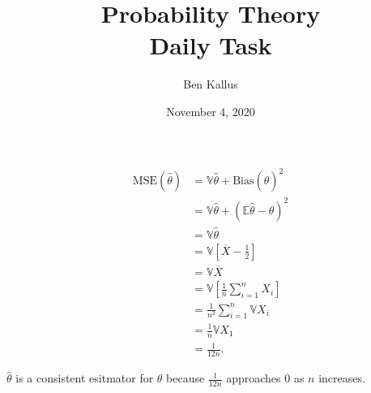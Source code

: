 \documentclass[12pt]{article}
\title{Probability Theory \\ Daily Task}
\author{Ben Kallus}
\date{November 4, 2020}
\begin{document}
\color{white}
\pagecolor{black}
\maketitle

\begin{align*}
  \text{MSE}(\hat\theta) &= \mathbb V\hat\theta + \text{Bias}(\hat\theta)^2 \\
                         &= \mathbb V\hat\theta + (\mathbb E\hat\theta - \theta)^2 \\
                         &= \mathbb V\hat\theta \\
                         &= \mathbb V\left[\overline X - \frac12\right] \\
                         &= \mathbb V\overline X \\
                         &= \mathbb V \left[ \frac1n \sum_{i=1}^nX_i \right] \\
                         &= \frac1{n^2} \sum_{i=1}^n \mathbb VX_i \\
                         &= \frac1{n} \mathbb VX_1 \\
                         &= \frac1{12n}.
\end{align*}

 $\hat\theta$ is a consistent esitmator for $\theta$ because $\frac1{12n}$ approaches 0 as $n$ increases.
\end{document}
